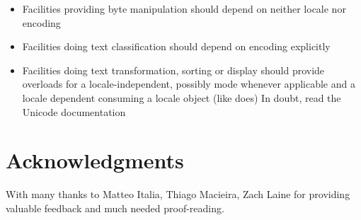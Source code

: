 \documentclass{wg21}
\begin{document}
\begin{itemize}
\item Facilities providing byte manipulation should depend on neither locale nor encoding
\item Facilities doing text classification should depend on encoding explicitly 
\item Facilities doing text transformation, sorting or display should provide overloads for a locale-independent, possibly  mode whenever applicable and a locale dependent consuming a locale object (like  does)
In doubt, read the Unicode documentation
\end{itemize}

\section{Acknowledgments}

With many thanks to Matteo Italia, Thiago Macieira, Zach Laine for providing valuable feedback and much needed proof-reading.




\end{document}
